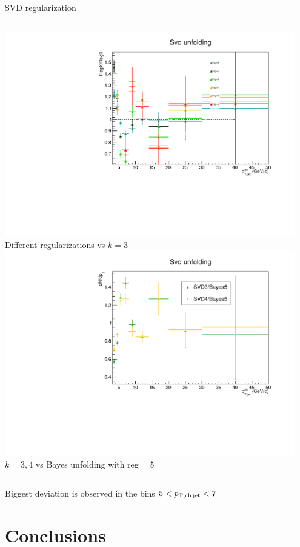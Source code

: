 \documentclass[xcolor={usenames,dvipsnames}, aspectratio=169]{beamer}
\begin{document}
\begin{frame}{SVD regularization}
\begin{columns}
\centering
\includegraphics[width=0.95\textwidth]{img/pPb/SvdEvolutionRatio.pdf}\\
\small
Different regularizations vs $k=3$
\centering
\includegraphics[width=0.95\textwidth]{img/pPb/SvdBayesRatio.pdf}\\
\small
$k=3, 4$ vs Bayes unfolding with reg$=5$
\end{columns}
\small
\centering
\vspace{10pt}
Biggest deviation is observed in the bins $5<p_{\mathrm{T,ch\, jet}}<7$~\GeVc
\end{frame}

\section{Conclusions}
\end{document}
